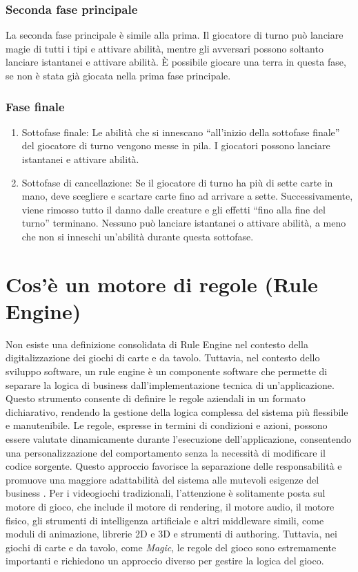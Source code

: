 \subsubsection{Seconda fase principale}
La seconda fase principale è simile alla prima. Il giocatore di turno può lanciare magie di tutti i tipi e attivare abilità, mentre gli avversari possono soltanto lanciare istantanei e attivare abilità. È possibile giocare una terra in questa fase, se non è stata già giocata nella prima fase principale.

\subsubsection{Fase finale}
\begin{enumerate}[label=\alph*.]
    \item Sottofase finale: Le abilità che si innescano “all'inizio della sottofase finale” del giocatore di turno vengono messe in pila. I giocatori possono lanciare istantanei e attivare abilità.
    \item Sottofase di cancellazione: Se il giocatore di turno ha più di sette carte in mano, deve scegliere e scartare carte fino ad arrivare a sette. Successivamente, viene rimosso tutto il danno dalle creature e gli effetti “fino alla fine del turno” terminano. Nessuno può lanciare istantanei o attivare abilità, a meno che non si inneschi un'abilità durante questa sottofase.
\end{enumerate}


\section{Cos'è un motore di regole (Rule Engine)}\label{sec:rule_engine}
Non esiste una definizione consolidata di Rule Engine nel contesto della digitalizzazione dei giochi di carte e da tavolo. Tuttavia, nel contesto dello sviluppo software, un rule engine è un componente software che permette di separare la logica di business dall'implementazione tecnica di un'applicazione. Questo strumento consente di definire le regole aziendali in un formato dichiarativo, rendendo la gestione della logica complessa del sistema più flessibile e manutenibile. Le regole, espresse in termini di condizioni e azioni, possono essere valutate dinamicamente durante l'esecuzione dell'applicazione, consentendo una personalizzazione del comportamento senza la necessità di modificare il codice sorgente. Questo approccio favorisce la separazione delle responsabilità e promuove una maggiore adattabilità del sistema alle mutevoli esigenze del business \cite{fowler-rule-engine}.
Per i videogiochi tradizionali, l'attenzione è solitamente posta sul motore di gioco, che include il motore di rendering, il motore audio, il motore fisico, gli strumenti di intelligenza artificiale e altri middleware simili, come moduli di animazione, librerie 2D e 3D e strumenti di authoring. Tuttavia, nei giochi di carte e da tavolo, come \emph{Magic}, le regole del gioco sono estremamente importanti e richiedono un approccio diverso per gestire la logica del gioco.\linebreak

